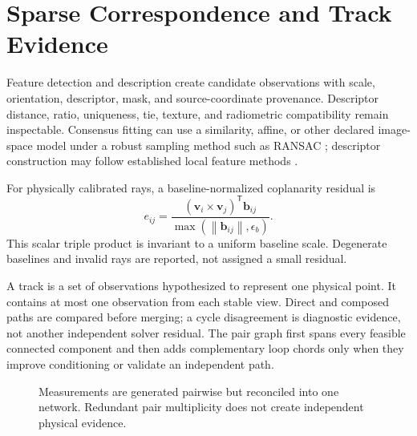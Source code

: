 \documentclass[journal]{IEEEtran}
\newcommand{\T}{^{\mathsf T}}
\newcommand{\norm}[1]{\left\lVert #1\right\rVert}
\begin{document}
\section{Sparse Correspondence and Track Evidence}

Feature detection and description create candidate observations with scale,
orientation, descriptor, mask, and source-coordinate provenance. Descriptor
distance, ratio, uniqueness, tie, texture, and radiometric compatibility remain
inspectable. Consensus fitting can use a similarity, affine, or other declared
image-space model under a robust sampling method such as RANSAC
\cite{FischlerBolles1981}; descriptor construction may follow established local
feature methods \cite{Lowe2004}.

For physically calibrated rays, a baseline-normalized coplanarity residual is
\begin{equation}
e_{ij}=\frac{(\bm v_i\times\bm v_j)\T\bm b_{ij}}
{\max(\norm{\bm b_{ij}},\epsilon_b)}.
\label{eq:coplanarity}
\end{equation}
This scalar triple product is invariant to a uniform baseline scale. Degenerate
baselines and invalid rays are reported, not assigned a small residual.

A track is a set of observations hypothesized to represent one physical point.
It contains at most one observation from each stable view. Direct and composed
paths are compared before merging; a cycle disagreement is diagnostic evidence,
not another independent solver residual. The pair graph first spans every
feasible connected component and then adds complementary loop chords only when
they improve conditioning or validate an independent path.

\begin{figure}[t]
\centering
{}
\caption{Measurements are generated pairwise but reconciled into one network.
Redundant pair multiplicity does not create independent physical evidence.}
\label{fig:network}
\end{figure}
\end{document}
